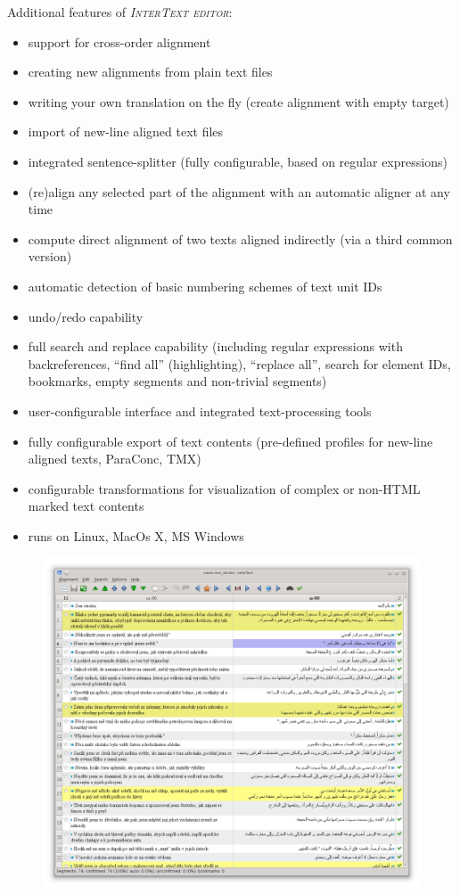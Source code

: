 \documentclass[a4paper,10pt,oneside]{book}
\newcommand{\ITeditor}{\textit{\textsc{InterText editor}}\xspace}
\begin{document}
Additional features of \ITeditor:
\begin{itemize}
  \item support for cross-order alignment
	\item creating new alignments from plain text files
  \item writing your own translation on the fly (create alignment with empty target)
  \item import of new-line aligned text files
	\item integrated sentence-splitter (fully configurable, based on regular expressions)
	\item (re)align any selected part of the alignment with an automatic aligner at any time
  \item compute direct alignment of two texts aligned indirectly (via a third common version)
	\item automatic detection of basic numbering schemes of text unit IDs
	\item undo/redo capability
	\item full search and replace capability (including regular expressions with backreferences, ``find all'' (highlighting), ``replace all'', search for element IDs, bookmarks, empty segments and non-trivial segments)
	\item user-configurable interface and integrated text-processing tools
	\item fully configurable export of text contents (pre-defined profiles for new-line aligned texts, ParaConc, TMX)
  \item configurable transformations for visualization of complex or non-HTML marked text contents
	\item runs on Linux, MacOs X, MS Windows
\end{itemize}

\begin{figure}[htb]
 \includegraphics[width=\textwidth]{screenshots/mainwindow_naum.png}
\end{figure}
\end{document}
